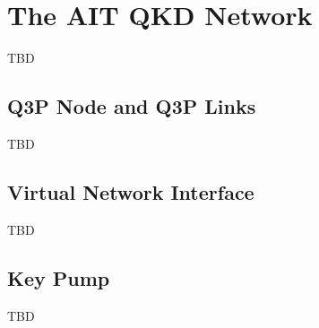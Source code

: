\chapter{The AIT QKD Network}
\label{chap:The AIT QKD Network}

TBD

\section{Q3P Node and Q3P Links}
\label{sec:Q3P Node and Q3P Links}

TBD

\section{Virtual Network Interface}
\label{sec:Virtual Network Interface}

TBD

\section{Key Pump}
\label{sec:Key Pump}

TBD

\clearpage
